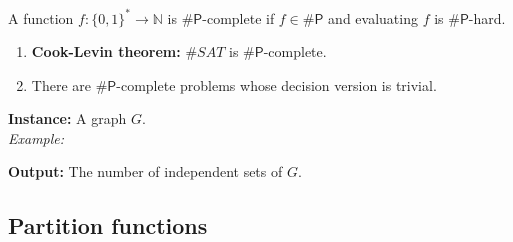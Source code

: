 \begin{frame}
	  \begin{definition}[$\# P$-completeness]
	  	A function $f \colon \{0,1\}^{*} \to \mathbb{N}$ is $\# \mathsf{P}$-complete if $f \in \# \mathsf{P}$ and evaluating $f$ is $\# \mathsf{P}$-hard.
	  \end{definition}

    \begin{enumerate}
    	\item {\color{TurkishRose} \textbf{Cook-Levin theorem:}} $\#SAT$ is $\# \mathsf{P}$-complete.
    	\item There are $\# \mathsf{P}$-complete problems whose decision version is trivial.
    \end{enumerate}

  \begin{example}
  	\begin{minipage}{0.4\textwidth}
    \textbf{Instance:} A graph $G$. \\
    \textit{Example: }
  	\end{minipage}
  	\begin{minipage}{0.4\textwidth}
  	\end{minipage}
      
     
     \vspace{3mm} 
    \textbf{Output:} The number of independent sets of $G$.\\
  \end{example}
\end{frame}

\subsection{Partition functions}

